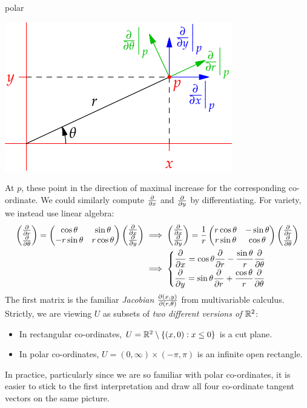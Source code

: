 \begin{examples}{}{polar}
\begin{enumerate}
	\hfill
	\begin{minipage}[t]{0.4\linewidth}\vspace{0pt}
		\flushright\includegraphics{forms-polar}
	\end{minipage}
	\bigbreak
	At $p$, these point in the direction of maximal increase for the corresponding co-ordinate.\smallbreak
	We could similarly compute $\partials x$ and $\partials y$ by differentiating. For variety, we instead use linear algebra:
	\begin{align*}
		\twovec{\partials r}{\partials\theta}
		=
		\begin{pmatrix}
			\cos\theta&\sin\theta\\
			-r\sin\theta&r\cos\theta
		\end{pmatrix}
		\twovec{\partials x}{\partials y}
		&\implies
		\twovec{\partials x}{\partials y}
		=
		\frac 1r
		\begin{pmatrix}
			r\cos\theta&-\sin\theta\\
			r\sin\theta&\cos\theta
		\end{pmatrix}
		\twovec{\partials r}{\partials\theta}\\
		&\implies
		\begin{cases}
			\displaystyle \partials x=\cos\theta\partials r-\frac{\sin\theta}r\partials\theta\\[5pt]
			\displaystyle \partials y=\sin\theta\partials r+\frac{\cos\theta}r\partials\theta
		\end{cases}
	\end{align*}
	The first matrix is the familiar \emph{Jacobian} $\partials[(x,y)]{(r,\theta)}$ from multivariable calculus.
	Strictly, we are viewing $U$ as subsets of \emph{two different versions of $\R^2$}:
	\begin{itemize}
	  \item In rectangular co-ordinates, $U=\R^2\setminus\{(x,0):x\le 0\}$ is a cut plane.
	  \item In polar co-ordinates, $U=(0,\infty)\times(-\pi,\pi)$ is an infinite open rectangle.
	\end{itemize}
	In practice, particularly since we are so familiar with polar co-ordinates, it is easier to stick to the first interpretation and draw all four co-ordinate tangent vectors on the same picture.
\end{enumerate}
\end{examples}






